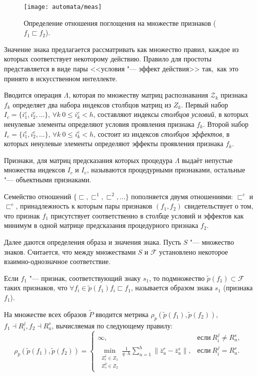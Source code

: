 \begin{figure}[h]
	\centering
	\texttt{[image: automata/meas]}
	\caption{Определение отношения поглощения на множестве признаков ($f_1\sqsubset f_2$).}
	\label{fig:rb_measure}
\end{figure}

Значение знака предлагается рассматривать как множество правил, каждое из которых соответствует некоторому действию. Правило для простоты представляется в виде пары <<условия "--- эффект действия>> так,~как это принято в искусственном интеллекте. 

Вводится операция $\Lambda$, которая по множеству матриц распознавания $\mathcal Z_k$ признака $f_k$ определяет два набора индексов столбцов матриц из $Z_k$. Первый набор $I_c=\{i_1^c,i_2^c,\dots\}$, $\forall k\ 0\leqslant i_k^c < h$, составляют индексы \textit{столбцов условий}, в которых ненулевые элементы определяют условия проявления признака $f_k$. Второй набор $I_e=\{i_1^e,i_2^e,\dots\}$, $\forall k\ 0\leqslant i_k^e < h$, состоит из индексов  \textit{столбцов эффектов}, в которых ненулевые элементы определяют эффекты проявления признака $f_k$. 

\begin{Def}
	Признаки, для матриц предсказания которых процедура $\Lambda$ выдаёт непустые множества индексов $I_c$ и $I_e$, называются процедурными признаками, остальные "--- объектными признаками.
\end{Def}

Семейство отношений $\{\sqsubset,\sqsubset^1,\sqsubset^2,\dots\}$ пополняется двумя отношениями: $\sqsubset^c$ и $\sqsubset^e$, принадлежность к которым пары признаков $(f_1,f_2)$ свидетельствует о том, что признак $f_1$ присутствует соответственно в столбце условий и эффектов как минимум в одной матрице предсказания процедурного признака $f_2$.

Далее даются определения образа и значения знака. Пусть $S$ "--- множество знаков. Считается, что между множествами $S$ и $\mathcal F$ установлено некоторое взаимно-однозначное соответствие.

\begin{Def}
	Если $f_1$ "--- признак, соответствующий знаку $s_1$, то подмножество $\tilde p(f_1)\subset\mathcal F$ таких признаков, что $\forall f_i\in\tilde p(f_1) f_i\sqsubset f_1$, называется образом знака $s_1$ (признака $f_1$).
\end{Def}

На множестве всех образов $\tilde P$ вводится метрика $\rho_p(\tilde p(f_1),\tilde p(f_2))$, $f_1\dashv R_i^j, f_2\dashv R_u^s$, вычисляемая по следующему правилу:
\[
\rho_p(\tilde p(f_1),\tilde p(f_2))=
\begin{cases}
\infty, & \text{если}\ R_i^j\not=R_u^s,\\
\min\limits_{\substack{Z_r^1\in Z_1\\Z_s^2\in Z_2}}\frac{1}{q\cdot h}\sum\limits_{u=1}^h\|\bar z_u^r-\bar z_u^s\|, & \text{если}\ R_i^j=R_u^s.
\end{cases}
\]

